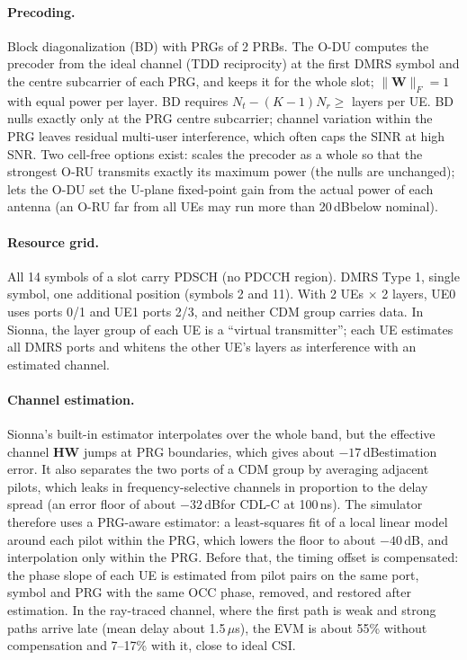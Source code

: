 \documentclass[11pt,a4paper]{article}
\DeclareRobustCommand{\code}[1]{\codeurl{#1}}  %
\newcommand{\dB}{\,dB}
\begin{document}
\paragraph{Precoding.} Block diagonalization (BD) with PRGs of 2 PRBs. The O-DU computes the precoder from the ideal channel
(TDD reciprocity) at the first DMRS symbol and the centre subcarrier of each PRG, and keeps it for the whole slot;
$\|\mathbf W\|_F = 1$ with equal power per layer. BD requires $N_t - (K-1) N_r \ge$ layers per UE. BD nulls exactly only at the
PRG centre subcarrier; channel variation within the PRG leaves residual multi-user interference, which often caps the SINR at
high SNR. Two cell-free options exist: \code{per_oru_power} scales the precoder as a whole so that the strongest O-RU transmits
exactly its maximum power (the nulls are unchanged); \code{fronthaul_agc} lets the O-DU set the U-plane fixed-point gain from the
actual power of each antenna (an O-RU far from all UEs may run more than 20\dB below nominal).

\paragraph{Resource grid.} All 14 symbols of a slot carry PDSCH (no PDCCH region). DMRS Type 1, single symbol, one additional
position (symbols 2 and 11). With 2 UEs $\times$ 2 layers, UE0 uses ports 0/1 and UE1 ports 2/3, and neither CDM group carries
data. In Sionna, the layer group of each UE is a ``virtual transmitter''; each UE estimates all DMRS ports and whitens the other
UE's layers as interference with an estimated channel.

\paragraph{Channel estimation.} Sionna's built-in estimator interpolates over the whole band, but the effective channel
$\mathbf H \mathbf W$ jumps at PRG boundaries, which gives about $-17$\dB estimation error. It also separates the two ports of a
CDM group by averaging adjacent pilots, which leaks in frequency-selective channels in proportion to the delay spread (an error
floor of about $-32$\dB for CDL-C at 100\,ns). The simulator therefore uses a PRG-aware estimator: a least-squares fit of a
local linear model around each pilot within the PRG, which lowers the floor to about $-40$\dB, and interpolation only within the
PRG. Before that, the timing offset is compensated: the phase slope of each UE is estimated from pilot pairs on the same port,
symbol and PRG with the same OCC phase, removed, and restored after estimation. In the ray-traced channel, where the first path
is weak and strong paths arrive late (mean delay about 1.5\,$\mu$s), the EVM is about 55\% without compensation and 7--17\% with
it, close to ideal CSI.
\end{document}
